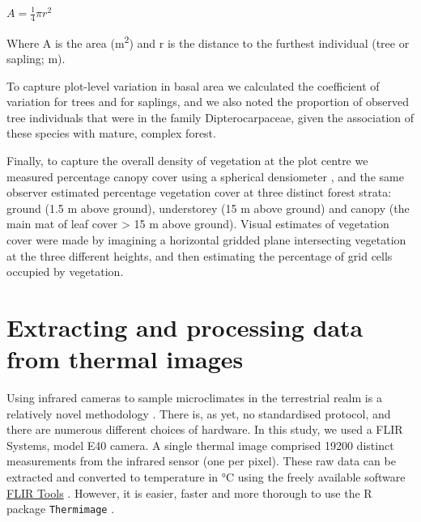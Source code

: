 \documentclass[12pt,a4paper,]{report}
\theoremstyle{definition}
\theoremstyle{definition}
\theoremstyle{definition}
\theoremstyle{remark}
\begin{document}
\begin{center}
$A = \frac{1}{4} \pi r^2$
\end{center}

Where A is the area (m\textsuperscript{2}) and r is the distance to the
furthest individual (tree or sapling; m).

To capture plot-level variation in basal area we calculated the
coefficient of variation for trees and for saplings, and we also noted
the proportion of observed tree individuals that were in the family
Dipterocarpaceae, given the association of these species with mature,
complex forest.

Finally, to capture the overall density of vegetation at the plot centre
we measured percentage canopy cover using a spherical densiometer
\citep{lemmon_spherical_1956}, and the same observer estimated
percentage vegetation cover at three distinct forest strata: ground (1.5
m above ground), understorey (15 m above ground) and canopy (the main
mat of leaf cover \textgreater{} 15 m above ground). Visual estimates of
vegetation cover were made by imagining a horizontal gridded plane
intersecting vegetation at the three different heights, and then
estimating the percentage of grid cells occupied by vegetation.

\pagebreak

\section{Extracting and processing data from thermal
images}\label{text-B-2}

Using infrared cameras to sample microclimates in the terrestrial realm
is a relatively novel methodology
\citetext{\citealp{scheffers_extreme_2017}; \citealp[but
see:][]{caillon_warming_2014}; \citealp{faye_toolbox_2016}}. There is,
as yet, no standardised protocol, and there are numerous different
choices of hardware. In this study, we used a FLIR Systems, model E40
camera. A single thermal image comprised 19200 distinct measurements
from the infrared sensor (one per pixel). These raw data can be
extracted and converted to temperature in °C using the freely available
software \href{http://www.flir.com/instruments/display/?id=54865}{FLIR
Tools} \citep[cf.][]{scheffers_extreme_2017}. However, it is easier,
faster and more thorough to use the R package \texttt{Thermimage}
\citep{tattersall_thermimage:_2017}.
\end{document}
